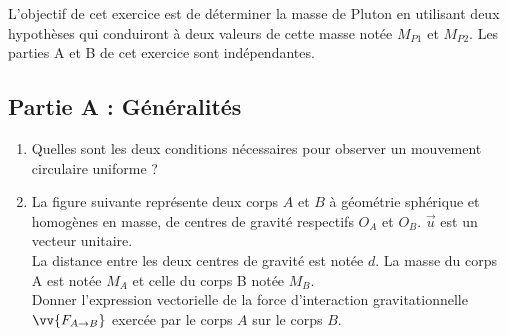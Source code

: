 \documentclass[a4paper,12pt]{article}
\begin{document}
L'objectif de cet exercice est de déterminer la masse de Pluton en utilisant deux hypothèses qui conduiront à deux valeurs de cette masse notée $M_{P1}$ et $M_{P2}$. Les parties A et B de cet exercice sont indépendantes.

\subsection*{Partie A : Généralités}
	\begin{enumerate}
	\item Quelles sont les deux conditions nécessaires pour observer un mouvement circulaire uniforme ?
	\item La figure suivante représente deux corps $A$ et $B$ à géométrie sphérique et homogènes en masse, de centres de gravité respectifs $O_A$ et $O_B$. $\vec{u}$ est un vecteur unitaire.\\
	La distance entre les deux centres de gravité est notée $d$.
	La masse du corps A est notée $M_A$ et celle du corps B notée $M_B$.\\
	Donner l'expression vectorielle de la force d'interaction gravitationnelle $\vv{F_{A\rightarrow B}}$ exercée par le corps $A$ sur le corps $B$.
	\end{enumerate}
\begin{center}
\end{center}
\end{document}
